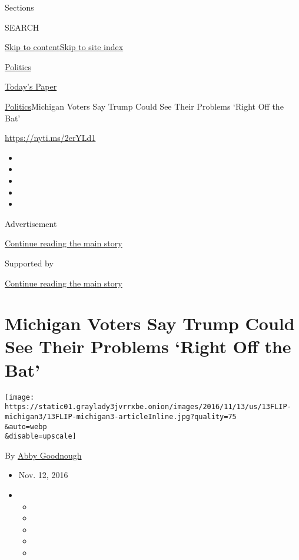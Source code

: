 Sections

SEARCH

\protect\hyperlink{site-content}{Skip to
content}\protect\hyperlink{site-index}{Skip to site index}

\href{https://www.nytimes3xbfgragh.onion/section/politics}{Politics}

\href{https://myaccount.nytimes3xbfgragh.onion/auth/login?response_type=cookie\&client_id=vi}{}

\href{https://www.nytimes3xbfgragh.onion/section/todayspaper}{Today's
Paper}

\href{/section/politics}{Politics}\textbar{}Michigan Voters Say Trump
Could See Their Problems `Right Off the Bat'

\url{https://nyti.ms/2erYLd1}

\begin{itemize}
\item
\item
\item
\item
\item
\end{itemize}

Advertisement

\protect\hyperlink{after-top}{Continue reading the main story}

Supported by

\protect\hyperlink{after-sponsor}{Continue reading the main story}

\hypertarget{michigan-voters-say-trump-could-see-their-problems-right-off-the-bat}{%
\section{Michigan Voters Say Trump Could See Their Problems `Right Off
the
Bat'}\label{michigan-voters-say-trump-could-see-their-problems-right-off-the-bat}}

\texttt{[image: https://static01.graylady3jvrrxbe.onion/images/2016/11/13/us/13FLIP-michigan3/13FLIP-michigan3-articleInline.jpg?quality=75\\\&auto=webp\\\&disable=upscale]}

By \href{http://www.nytimes3xbfgragh.onion/by/abby-goodnough}{Abby
Goodnough}

\begin{itemize}
\item
  Nov. 12, 2016
\item
  \begin{itemize}
  \item
  \item
  \item
  \item
  \item
  \end{itemize}
\end{itemize}

